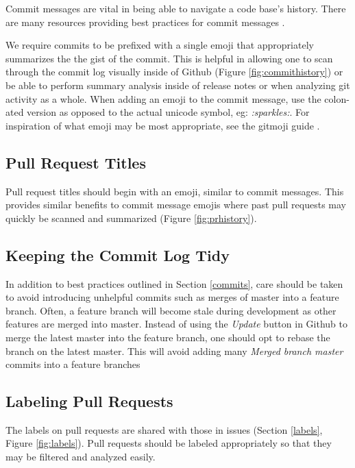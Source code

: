 \documentclass[a4paper,12pt,titlepage]{scrartcl}
\begin{document}
	Commit messages are vital in being able to navigate a code base's history.
	There are many resources providing best practices for commit messages \cite{beams, socommits}.
	
	We require commits to be prefixed with a single emoji that appropriately summarizes the the gist of the commit.
	This is helpful in allowing one to scan through the commit log visually inside of Github (Figure \ref{fig:commithistory}) or be able to perform summary analysis inside of release notes or when analyzing git activity as a whole.
	When adding an emoji to the commit message, use the colon-ated version as opposed to the actual unicode symbol, eg: {\em :sparkles:}.
	For inspiration of what emoji may be most appropriate, see the gitmoji guide \cite{gitmoji}.
	
	\subsection{Pull Request Titles}
	
	Pull request titles should begin with an emoji, similar to commit messages.
	This provides similar benefits to commit message emojis where past pull requests may quickly be scanned and summarized (Figure \ref{fig:prhistory}).
	
	\subsection{Keeping the Commit Log Tidy}
	
	In addition to best practices outlined in Section \ref{commits}, care should be taken to avoid introducing unhelpful commits such as merges of master into a feature branch.
	Often, a feature branch will become stale during development as other features are merged into master.
	Instead of using the {\em Update} button in Github to merge the latest master into the feature branch, one should opt to rebase the branch on the latest master.
	This will avoid adding many {\em Merged branch master} commits into a feature branches 
	
	\subsection{Labeling Pull Requests}
	
	The labels on pull requests are shared with those in issues (Section \ref{labels}, Figure \ref{fig:labels}).
	Pull requests should be labeled appropriately so that they may be filtered and analyzed easily.
	
\end{document}
